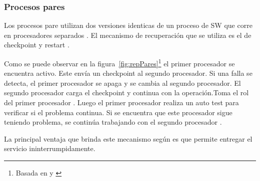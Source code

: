 \subsubsection{Procesos pares}
Los procesos pare utilizan dos versiones identicas de un proceso de \ac{SW} que corre en 
procesadores separados \citep{FTDesign} \citep{SoftwareFaultToleranceATutorial}. El mecanismo de 
recuperación que se utiliza es el de checkpoint y restart \citep{SoftwareFaultToleranceATutorial}.  

Como se puede observar en la figura~\ref{fig:repPares}\footnote{Basada en \cite{FTDesign} y 
\cite{SoftwareFaultToleranceATutorial}} el primer procesador se encuentra activo. Este envía un 
checkpoint al segundo procesador. Si una falla se detecta, el primer procesador se apaga y se cambia 
al segundo procesador. El segundo procesador carga el checkpoint y continua con la operación.Toma el 
rol del primer procesador \citep{SoftwareFaultToleranceATutorial}. Luego el 
primer procesador realiza un auto test para verificar si el problema continua. Si se encuentra que 
este procesador sigue teniendo problema, se continúa trabajando con el segundo procesador 
\citep{FTDesign}.

La principal ventaja que brinda este mecanismo según \cite{FTDesign} es que permite entregar el 
servicio ininterrumpidamente.


\begin{comment}

\begin{figure}[h]
 \centering
 \begin{tikzpicture}[node distance=1cm, auto,]
   \tikzset{
   cuadro/.style={
           rectangle,
           draw=black,
           text width=6.5em,
           minimum height=2em,
           text centered},
    arrow/.style={
           ->,
           thick,
           shorten <=2pt,
           shorten >=2pt,}	
    }
  \tikzstyle{circulo} = [draw, fill=black, circle, node distance=1cm, minimum size=5pt, inner 
sep=3pt]
    
  \node[inner sep=5pt] (entrada) {Entrada};
  \node[cuadro, right=0.5cm of entrada] (prim) {Procesador Primario};
  \node[cuadro, inner sep=5pt,below=0.5cm of prim] (secu) {Procesador Secundario};
  \node[cuadro, inner sep=10pt, right=1cm of prim] (selec) {Switch};
  \node[inner sep=0pt, right=2cm of selec](ghost1){};
  \node[cuadro, below=0.5cm of ghost1](detector) {Detector de error};
  \node[inner sep=0pt, right=0.5cm of ghost1] (salida) {Salida};
  
  \draw[arrow] (entrada)--(prim);
  \draw[arrow] (entrada)|-(secu);
  \draw[arrow, dashed] (prim.-30) -- (secu.30);
  \draw[arrow, dashed] (secu.150) -- (prim.-150);
  \draw[arrow] (prim)--(selec);
  \draw[arrow] (secu)-|(selec.-150);
  \draw[arrow] (detector)-|(selec);
  \draw[arrow] (selec)--(salida);
  \draw[arrow] (ghost1)--(detector);
 \end{tikzpicture}
 \caption{Representación del proceso pares}
 \label{fig:repPares}
\end{figure}

\end{comment}

